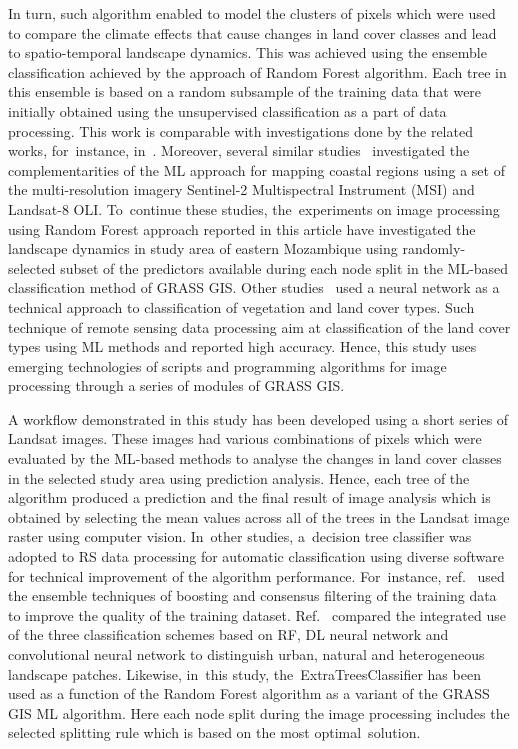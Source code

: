 \documentclass[coasts,article,accept,pdftex,oneauthor]{Definitions/mdpi}
\begin{document}
In turn, such algorithm enabled to model the clusters of pixels which {were} used to compare the climate effects {that cause} changes in land cover classes and {lead to spatio-temporal }landscape {dynamics}. This was achieved using the ensemble classification {achieved by the approach of Random Forest algorithm}. Each tree in {this} ensemble is based on a random subsample of the training data that were initially obtained using {the }unsupervised classification as a part of data processing. This work is comparable with investigations done by {the }related works{, for~instance,} in~\cite{FERNANDO2023,KOLARIK2024111445}. {Moreover}, several similar studies~\cite{BERA20234691,land12122149,ZHANG2023108250} investigated the complementarities of the ML approach for mapping coastal regions using a set of {the }multi-resolution imagery Sentinel-2 Multispectral Instrument (MSI) and Landsat-8 OLI. To~continue these studies, the~experiments on image processing using Random Forest approach reported in this article have investigated the landscape dynamics in study area of eastern Mozambique using randomly-selected subset of the predictors available during each node split in the ML-based classification method of GRASS GIS. Other studies~\cite{MOUNTRAKIS2023106,SINGH2021100645,ZHENG2023100974} used a neural network {as a technical approach to classification of} vegetation and land cover {types. Such }technique {of} remote sensing data processing {aim at classification of the }land cover types using ML methods and reported high accuracy. {Hence, this study uses emerging technologies of scripts and programming algorithms for image processing through a series of modules of GRASS GIS.}

A workflow demonstrated in this study has been developed using a short series of Landsat images. These images had various combinations of pixels which were evaluated by the ML-based methods to analyse the changes in land cover classes in the selected study area using prediction analysis. Hence, each tree of the algorithm produced a prediction and the final result of image analysis which is obtained by selecting the mean values across all of the trees in the Landsat image raster using computer vision. In~other studies, a~decision tree classifier was adopted to RS data processing for automatic classification using diverse software for technical improvement of the algorithm performance. For~instance, ref.~\cite{BROWNDECOLSTOUN2003316} used the ensemble techniques of boosting and consensus filtering of the training data to improve the quality of the training dataset. Ref.~\cite{VAIDYA2024101770} compared the integrated use of the three classification schemes based on RF, DL neural network and convolutional neural network to distinguish urban, natural and heterogeneous landscape patches. Likewise, in~this study, the~ExtraTreesClassifier has been used as a function of the Random Forest algorithm as a variant of the GRASS GIS ML algorithm. Here each node split during the image processing includes the selected splitting rule which is based on the most optimal~solution. 
\end{document}
